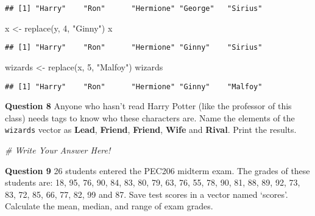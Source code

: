 \documentclass[
]{article}
\newenvironment{Shaded}{\begin{snugshade}}{\end{snugshade}}
\newcommand{\CommentTok}[1]{\textcolor[rgb]{0.56,0.35,0.01}{\textit{#1}}}
\newcommand{\DecValTok}[1]{\textcolor[rgb]{0.00,0.00,0.81}{#1}}
\newcommand{\FunctionTok}[1]{\textcolor[rgb]{0.00,0.00,0.00}{#1}}
\newcommand{\NormalTok}[1]{#1}
\newcommand{\OtherTok}[1]{\textcolor[rgb]{0.56,0.35,0.01}{#1}}
\newcommand{\StringTok}[1]{\textcolor[rgb]{0.31,0.60,0.02}{#1}}
\begin{document}
\begin{verbatim}
## [1] "Harry"    "Ron"      "Hermione" "George"   "Sirius"
\end{verbatim}

\begin{Shaded}
\begin{Highlighting}[]
\NormalTok{x }\OtherTok{\textless{}{-}} \FunctionTok{replace}\NormalTok{(y, }\DecValTok{4}\NormalTok{, }\StringTok{"Ginny"}\NormalTok{)}
\NormalTok{x}
\end{Highlighting}
\end{Shaded}

\begin{verbatim}
## [1] "Harry"    "Ron"      "Hermione" "Ginny"    "Sirius"
\end{verbatim}

\begin{Shaded}
\begin{Highlighting}[]
\NormalTok{wizards }\OtherTok{\textless{}{-}} \FunctionTok{replace}\NormalTok{(x, }\DecValTok{5}\NormalTok{, }\StringTok{"Malfoy"}\NormalTok{)}
\NormalTok{wizards}
\end{Highlighting}
\end{Shaded}

\begin{verbatim}
## [1] "Harry"    "Ron"      "Hermione" "Ginny"    "Malfoy"
\end{verbatim}

\textbf{Question 8} Anyone who hasn't read Harry Potter (like the
professor of this class) needs tags to know who these characters are.
Name the elements of the \texttt{wizards} vector as \textbf{Lead},
\textbf{Friend}, \textbf{Friend}, \textbf{Wife} and \textbf{Rival}.
Print the results.

\begin{Shaded}
\begin{Highlighting}[]
\CommentTok{\# Write Your Answer Here!}
\end{Highlighting}
\end{Shaded}

\textbf{Question 9} 26 students entered the PEC206 midterm exam. The
grades of these students are: 18, 95, 76, 90, 84, 83, 80, 79, 63, 76,
55, 78, 90, 81, 88, 89, 92, 73, 83, 72, 85, 66, 77, 82, 99 and 87. Save
test scores in a vector named `scores'. Calculate the mean, median, and
range of exam grades.
\end{document}
